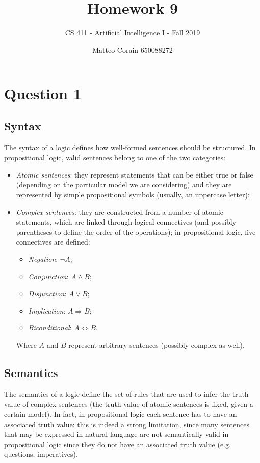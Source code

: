 \documentclass[letterpaper,headings=standardclasses]{scrartcl}
\title{Homework 9}
\subtitle{CS 411 - Artificial Intelligence I - Fall 2019}
\author{Matteo Corain 650088272}
\begin{document}
\maketitle

\section{Question 1}

\subsection{Syntax}

The syntax of a logic defines how well-formed sentences should be structured. In propositional logic, valid sentences belong to one of the two categories:

\begin{itemize}
    \item \emph{Atomic sentences}: they represent statements that can be either true or false (depending on the particular model we are considering) and they are represented by simple propositional symbols (usually, an uppercase letter);
    \item \emph{Complex sentences}: they are constructed from a number of atomic statements, which are linked through logical connectives (and possibly parentheses to define the order of the operations); in propositional logic, five connectives are defined:
    \begin{itemize}
        \item \emph{Negation}: $\neg A$;
        \item \emph{Conjunction}: $A \wedge B$;
        \item \emph{Disjunction}: $A \vee B$;
        \item \emph{Implication}: $A \Rightarrow B$;
        \item \emph{Biconditional}: $A \Leftrightarrow B$.
    \end{itemize}
    Where $A$ and $B$ represent arbitrary sentences (possibly complex as well).
\end{itemize}

\subsection{Semantics}

The semantics of a logic define the set of rules that are used to infer the truth value of complex sentences (the truth value of atomic sentences is fixed, given a certain model). In fact, in propositional logic each sentence has to have an associated truth value: this is indeed a strong limitation, since many sentences that may be expressed in natural language are not semantically valid in propositional logic since they do not have an associated truth value (e.g. questions, imperatives).
\end{document}
